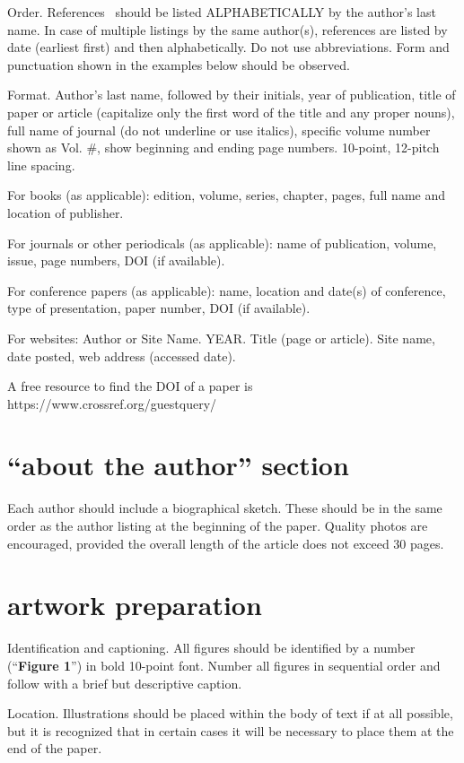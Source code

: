 \documentclass[10pt,twocolumn,twoside]{article}
\begin{document}
Order. References~\citep{Archie1942} should be listed ALPHABETICALLY by the author’s last name. In case of multiple listings by the same author(s), references are listed by date (earliest first) and then alphabetically. Do not use abbreviations. Form and punctuation shown in the examples below should be observed.

Format. Author's last name, followed by their initials, year of publication, title of paper or article (capitalize only the first word of the title and any proper nouns), full name of journal (do not underline or use italics), specific volume number shown as Vol. \#, show beginning and ending page numbers. 10-point, 12-pitch line spacing.

For books (as applicable): edition, volume, series, chapter, pages, full name and location of publisher.

For journals or other periodicals (as applicable): name of publication, volume, issue, page numbers, DOI (if available).

For conference papers (as applicable): name, location and date(s) of conference, type of presentation, paper number, DOI (if available). 

For websites: Author or Site Name. YEAR. Title (page or article). Site name, date posted, web address (accessed date). 

A free resource to find the DOI of a paper is https://www.crossref.org/guestquery/ 

\section{“about the author” section}
Each author should include a biographical sketch. These should be in the same order as the author listing at the beginning of the paper. Quality photos are encouraged, provided the overall length of the article does not exceed 30 pages.

\section{artwork preparation}
Identification and captioning. All figures should be identified by a number (“\textbf{Figure 1}”) in bold 10-point font. Number all figures in sequential order and follow with a brief but descriptive caption. 

Location. Illustrations should be placed within the body of text if at all possible, but it is recognized that in certain cases it will be necessary to place them at the end of the paper.
\end{document}
